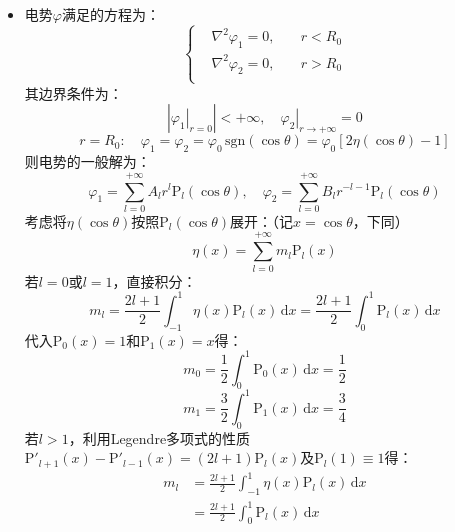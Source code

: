 \documentclass[a4paper,fontset=none]{ctexart}
\begin{document}
\begin{itemize}
        这就保证了导体表面$x=0$和$y=0$处电势为0。

        故电势分布为：
        \begin{align*}
        \varphi
        &= \frac{1}{4\pi\varepsilon_0}\left[\frac{q}{\sqrt{(x-a)^2+(y-b)^2+z^2}} - \frac{q}{\sqrt{(x-a)^2+(y+b)^2+z^2}} \right. \\
        &\quad\left. +\ \frac{q}{\sqrt{(x+a)^2+(y+b)^2+z^2}} - \frac{q}{\sqrt{(x+a)^2+(y-b)^2+z^2}}\right]
        \end{align*}

        \item[18.]
        电势$\varphi$满足的方程为：
        \[
        \left\{
            \begin{aligned}
                &\nabla^2\varphi_1 = 0,\quad &r<R_0 \\
                &\nabla^2\varphi_2 = 0,\quad &r>R_0 \\
            \end{aligned}
        \right.
        \]
        其边界条件为：
        \[
        \left|\left.\varphi_1\right|_{r=0}\right| < +\infty,\quad
        \left.\varphi_2\right|_{r\to+\infty} = 0
        \]
        \[
        r = R_0:\quad \varphi_1 = \varphi_2 = \varphi_0\,\mathrm{sgn}(\cos\theta) = \varphi_0[2\eta(\cos\theta)-1]
        \]
        则电势的一般解为：
        \[
        \varphi_1 = \sum_{l=0}^{+\infty}A_l r^l\mathrm{P}_l(\cos\theta),\quad
        \varphi_2 = \sum_{l=0}^{+\infty}B_l r^{-l-1}\mathrm{P}_l(\cos\theta)
        \]
        考虑将$\eta(\cos\theta)$按照$\mathrm{P}_l(\cos\theta)$展开：（记$x=\cos\theta$，下同）
        \[
        \eta(x) = \sum_{l=0}^{+\infty}m_l\mathrm{P}_l(x)
        \]
        若$l=0$或$l=1$，直接积分：
        \[
        m_l = \frac{2l+1}{2}\int_{-1}^1\eta(x)\mathrm{P}_l(x)\,\mathrm{d}x = \frac{2l+1}{2}\int_{0}^1\mathrm{P}_l(x)\,\mathrm{d}x
        \]
        代入$\mathrm{P}_0(x)=1$和$\mathrm{P}_1(x)=x$得：
        \[
        m_0 = \frac{1}{2}\int_0^1\mathrm{P}_0(x)\,\mathrm{d}x = \frac{1}{2}
        \]
        \[
        m_1 = \frac{3}{2}\int_0^1\mathrm{P}_1(x)\,\mathrm{d}x = \frac{3}{4}
        \]
        若$l>1$，利用Legendre多项式的性质$\mathrm{P}'_{l+1}(x)-\mathrm{P}'_{l-1}(x)=(2l+1)\mathrm{P}_l(x)$及$\mathrm{P}_l(1)\equiv1$得：
        \begin{align*}
            m_l
            &= \frac{2l+1}{2}\int_{-1}^1\eta(x)\mathrm{P}_l(x)\,\mathrm{d}x \\
            &= \frac{2l+1}{2}\int_{0}^1\mathrm{P}_l(x)\,\mathrm{d}x \\

\end{align*}
\end{itemize}
\end{document}
